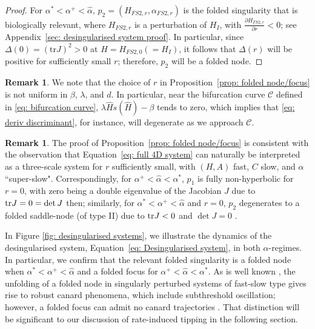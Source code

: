 \documentclass{article}
\theoremstyle{definition}
\numberwithin{equation}{section}
\newtheorem{remark}[prop]{Remark}
\begin{document}
\begin{proof}
For $\alpha^\ast<\alpha^+<\hat\alpha$, $p_2=(H_{FS2,r},\alpha_{FS2,r})$ is the folded singularity that is biologically relevant, where $H_{FS2,r}$ is a perturbation of $H_{I}$, with $\frac{\partial H_{FS2,r}}{\partial r}<0$; see Appendix~\ref{sec: desingularised system proof}. In particular, since $\Delta(0)=(\mathrm{tr}J)^2>0$ at $H=H_{FS2,0}(=H_I)$, it follows that $\Delta(r)$ will be positive for sufficiently small $r$; therefore, $p_2$ will be a folded node.
\end{proof}

\begin{remark}\label{rem: bifurcation curve}
We note that the choice of $r$ in Proposition~\ref{prop: folded node/focus} is not uniform in $\beta$, $\lambda$, and $d$. In particular, near the bifurcation curve $\mathcal{C}$ defined in \eqref{eq: bifurcation curve}, $\lambda \hat{H}s(\hat{H})-\beta$ tends to zero, which implies that \eqref{eq: deriv discriminant}, for instance, will degenerate as we approach $\mathcal{C}$.
\end{remark}

\begin{remark}\label{degeneracy}
The proof of Proposition~\ref{prop: folded node/focus} is consistent with the observation that Equation~\eqref{eq: full 4D system} can naturally be interpreted as a three-scale system for $r$ sufficiently small, with $(H,A)$ fast, $C$ slow, and $\alpha$ ``super-slow". Correspondingly, for $\alpha^+<\hat\alpha<\alpha^\ast$, $p_1$ is fully non-hyperbolic for $r=0$, with zero being a double eigenvalue of the Jacobian $J$ due to ${\rm tr}J=0=\det J$ then; similarly, for $\alpha^\ast<\alpha^+<\hat\alpha$ and $r=0$, $p_2$ degenerates to a folded saddle-node (of type II) due to ${\rm tr}J<0$ and $\det J=0$ \cite{MR2136520}.
\end{remark}

In Figure \ref{fig: desingularised systems}, we illustrate the dynamics of the desingularised system, Equation~\eqref{eq: Desingularised system}, in both $\alpha$-regimes. In particular, we confirm that the relevant folded singularity is a folded node when $\alpha^\ast<\alpha^{+}<\hat\alpha$ and a folded focus for $\alpha^{+}<\hat\alpha<\alpha^\ast$. As is well known \cite[Theorem $4.2$]{Canards}, the unfolding of a folded node in singularly perturbed systems of fast-slow type gives rise to robust canard phenomena, which include subthreshold oscillation; however, a folded focus can admit no canard trajectories \cite[Corollary~3.1]{Canards}. That distinction will be significant to our discussion of rate-induced tipping in the following section.
\end{document}
